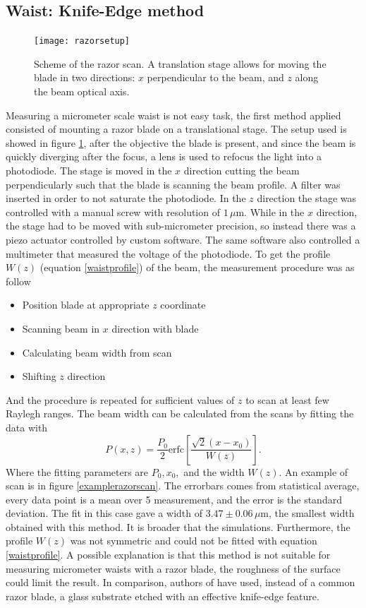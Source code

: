 \subsection{Waist: Knife-Edge method}
\begin{figure}[H]
\centering
\texttt{[image: razorsetup]}
\caption{Scheme of the razor scan. A translation stage allows for moving the blade in two directions: $x$ perpendicular to the beam, and $z$ along the beam optical axis.}
\label{razorscan}
\end{figure}
Measuring a micrometer scale waist is not easy task, the first method applied consisted of mounting a razor blade on a translational stage. The setup used is showed in figure \ref{razorscan}, after the objective the blade is present, and since the beam is quickly diverging after the focus, a lens is used to refocus the light into a photodiode. The stage is moved in the $x$ direction cutting the beam perpendicularly such that the blade is scanning the beam profile. A filter was inserted in order to not saturate the photodiode.
In the $z$ direction the stage was controlled with a manual screw with resolution of $1\,\mu$m. While in the $x$ direction, the stage had to be moved with sub-micrometer precision, so instead there was a piezo actuator controlled by custom software. The same software also controlled a multimeter that measured the voltage of the photodiode. To get the profile $W(z)$ (equation \eqref{waistprofile}) of the beam, the measurement procedure was as follow
\begin{itemize}
\item Position blade at appropriate $z$ coordinate
\item Scanning beam in $x$ direction with blade
\item Calculating beam width from scan
\item Shifting $z$ direction
\end{itemize}
And the procedure is repeated for sufficient values of $z$ to scan at least few Raylegh ranges. The beam width can be calculated from the scans by fitting the data with \cite{knifeedge}
\begin{equation}
P(x,z) = \frac{P_0}{2}\text{erfc}\left[\frac{\sqrt{2}(x-x_0)}{W(z)} \right].
\end{equation}
Where the fitting parameters are $P_0, x_0,$ and the width $W(z)$. An example of scan is in figure \ref{examplerazorscan}. The errorbars comes from statistical average, every data point is a mean over 5 measurement, and the error is the standard deviation. The fit in this case gave a width of $3.47\pm 0.06\,\mu$m, the smallest width obtained with this method. It is broader that the simulations. Furthermore, the profile $W(z)$ was not symmetric and could not be fitted with equation \eqref{waistprofile}. A possible explanation is that this method is not suitable for measuring micrometer waists with a razor blade, the roughness of the surface could limit the result. In comparison, authors of \cite{Cannon:86} have used, instead of a common razor blade, a glass substrate etched with an effective knife-edge feature.
